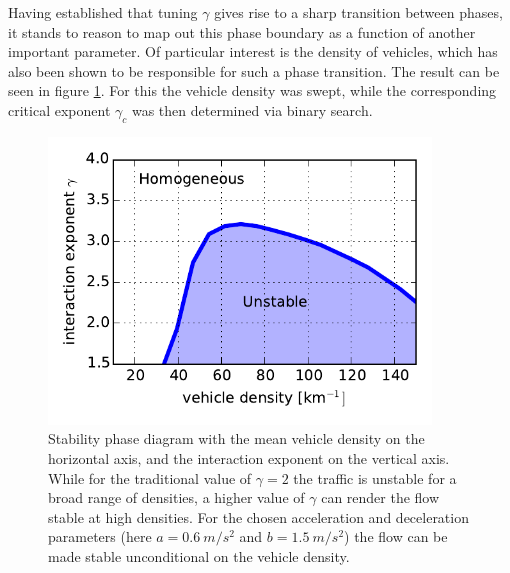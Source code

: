 Having established that tuning $\gamma$ gives rise to a sharp transition between phases, it stands to reason to map out this phase boundary as a function of another important parameter. Of particular interest is the density of vehicles, which has also been shown to be responsible for such a phase transition. The result can be seen in figure \ref{fig:phase_diagram}. For this the vehicle density was swept, while the corresponding critical exponent $\gamma_c$ was then determined via binary search.
\begin{figure}
    \centering
    \includegraphics[width=4in]{../img/phase_diagram.pdf}
    \caption{Stability phase diagram with the mean vehicle density on the horizontal axis, and the interaction exponent on the vertical axis. While for the traditional value of $\gamma=2$ the traffic is unstable for a broad range of densities, a higher value of $\gamma$ can render the flow stable at high densities. For the chosen acceleration and deceleration parameters (here $a=\SI{0.6}{m/s^2}$ and $b=\SI{1.5}{m/s^2}$) the flow can be made stable unconditional on the vehicle density.}
    \label{fig:phase_diagram}
\end{figure}
\clearpage